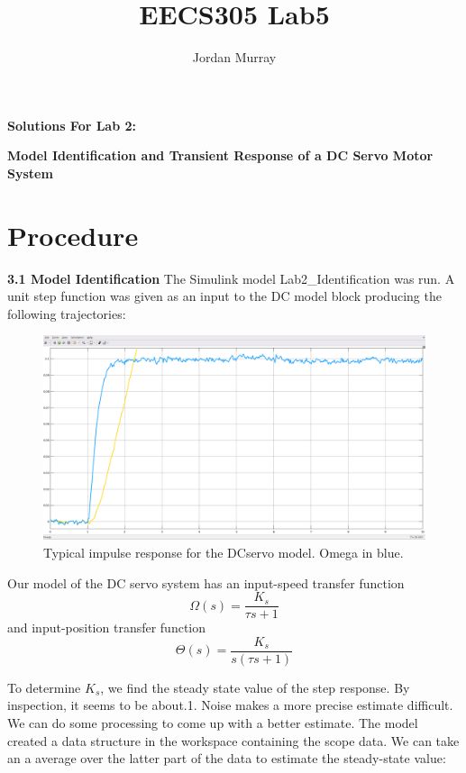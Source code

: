 \documentclass[11pt,a4paper]{article}
\author{Jordan Murray}
\title{EECS305 Lab5}
\begin{document}
\begin{center}
\fontsize{24}{12}\selectfont
\textbf{Solutions For Lab 2:}

\textbf{ Model Identification and Transient Response of a DC Servo Motor System }
\end{center}

\section{Procedure}
\textbf{3.1 Model Identification}
The Simulink model Lab2\_Identification was run. A unit step function was given as an input to the DC model block producing the following trajectories:

\begin{figure}[H]
\includegraphics[width=\textwidth]{imglab/lab2sol_identification1.png}
\caption{Typical impulse response for the DCservo model. Omega in blue.}
\label{fig:id1}
\end{figure}

Our model of the DC servo system has an input-speed transfer function
\begin{equation}
	\Omega \left( s \right) = \frac{K_{s}}{\tau s + 1}
\end{equation}
and input-position transfer function
\begin{equation}
	\Theta \left( s \right) = \frac{K_{s}}{s \left( \tau s + 1 \right)}
\end{equation}

 To determine $K_{s}$, we find the steady state value of the step response. By inspection, it seems to be about.1. Noise makes a more precise estimate difficult. We can do some processing to come up with a better estimate. The model created a data structure in the workspace containing the scope data. We can take an a average over the latter part of the data to estimate the steady-state value:
 
\end{document}
